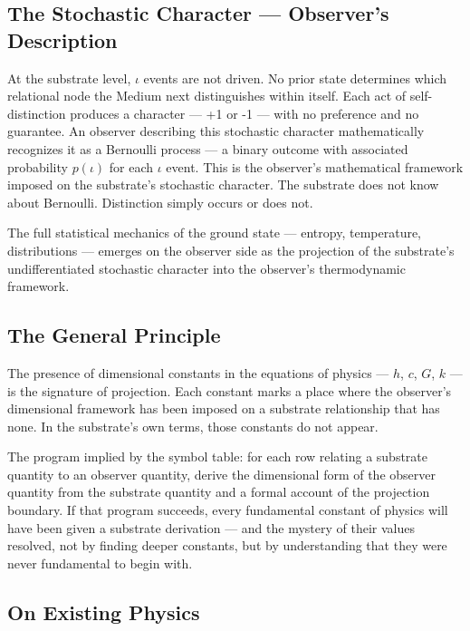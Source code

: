\documentclass[11pt,letterpaper]{article}
\begin{document}
\subsection{The Stochastic Character --- Observer's Description}
\label{sec:org109698f}

At the substrate level, \(\iota\) events are not driven. No prior state determines which relational node the Medium next distinguishes within itself. Each act of self-distinction produces a character --- +1 or -1 --- with no preference and no guarantee. An observer describing this stochastic character mathematically recognizes it as a Bernoulli process --- a binary outcome with associated probability \(p(\iota)\) for each \(\iota\) event. This is the observer's mathematical framework imposed on the substrate's stochastic character. The substrate does not know about Bernoulli. Distinction simply occurs or does not.

The full statistical mechanics of the ground state --- entropy, temperature, distributions --- emerges on the observer side as the projection of the substrate's undifferentiated stochastic character into the observer's thermodynamic framework.

\subsection{The General Principle}
\label{sec:orgb80503b}

The presence of dimensional constants in the equations of physics --- \(h\), \(c\), \(G\), \(k\) --- is the signature of projection. Each constant marks a place where the observer's dimensional framework has been imposed on a substrate relationship that has none. In the substrate's own terms, those constants do not appear.

The program implied by the symbol table: for each row relating a substrate quantity to an observer quantity, derive the dimensional form of the observer quantity from the substrate quantity and a formal account of the projection boundary. If that program succeeds, every fundamental constant of physics will have been given a substrate derivation --- and the mystery of their values resolved, not by finding deeper constants, but by understanding that they were never fundamental to begin with.

\subsection{On Existing Physics}
\label{sec:orgdb56708}
\end{document}
